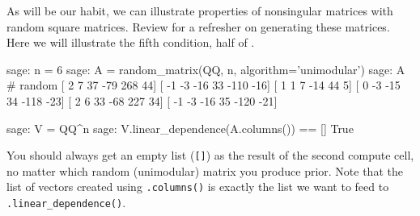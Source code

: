 As will be our habit, we can illustrate properties of nonsingular matrices with random square matrices.  Review  for a refresher on generating these matrices.  Here we will illustrate the fifth condition, half of .
%
\begin{sageexample}
sage: n = 6
sage: A = random_matrix(QQ, n, algorithm='unimodular')
sage: A                                  # random
[   2    7   37  -79  268   44]
[  -1   -3  -16   33 -110  -16]
[   1    1    7  -14   44    5]
[   0   -3  -15   34 -118  -23]
[   2    6   33  -68  227   34]
[  -1   -3  -16   35 -120  -21]
\end{sageexample}
%
\begin{sageexample}
sage: V = QQ^n
sage: V.linear_dependence(A.columns()) == []
True
\end{sageexample}
%
You should always get an empty list (\verb?[]?) as the result of the second compute cell, no matter which random (unimodular) matrix you produce prior.  Note that the list of vectors created using \verb?.columns()? is exactly the list we want to feed to \verb?.linear_dependence()?.
%
\begin{sageverbatim}
\end{sageverbatim}
%